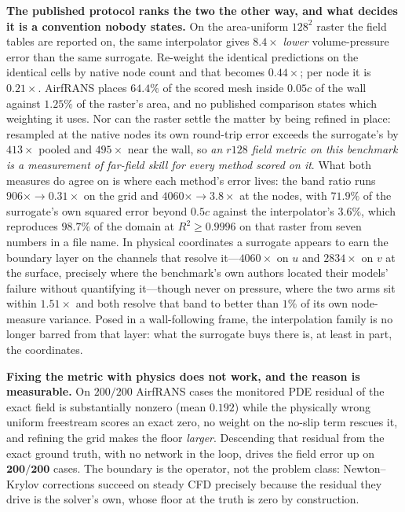 \textbf{The published protocol ranks the two the other way, and what decides it is a
convention nobody states.} On the area-uniform $128^2$ raster the field tables are reported on, the
same interpolator gives $8.4\times$ \emph{lower} volume-pressure error than the same
surrogate. Re-weight the identical predictions on the identical cells by native node count
and that becomes $0.44\times$; per node it is $0.21\times$. AirfRANS places $64.4\%$ of the
scored mesh inside $0.05c$ of the wall against $1.25\%$ of the raster's area, and no published
comparison states which weighting it uses. Nor can the raster settle the matter by being
refined in place: resampled at the native nodes its own round-trip error exceeds the
surrogate's by $413\times$ pooled and $495\times$ near the wall, so \emph{an $r128$ field
metric on this benchmark is a measurement of far-field skill for every method scored on
it}. What both measures do agree on is where each method's error lives: the band ratio runs
$906\times \to 0.31\times$ on the grid and $4060\times \to 3.8\times$ at the nodes, with
$71.9\%$ of the surrogate's own squared error beyond $0.5c$ against the interpolator's
$3.6\%$, which reproduces $98.7\%$ of the domain at $R^2\ge0.9996$ on that raster from seven
numbers in a file name. In physical coordinates a surrogate appears to earn the boundary
layer on the channels that resolve it---$4060\times$ on $u$ and $2834\times$ on $v$ at the
surface, precisely where the benchmark's own authors located their models' failure without
quantifying it---though never on pressure, where the two arms sit within $1.51\times$ and
both resolve that band to better than $1\%$ of its own node-measure variance. Posed in a
wall-following frame, the interpolation family is no longer barred from that layer: what the
surrogate buys there is, at least in part, the coordinates.

\textbf{Fixing the metric with physics does not work, and the reason is measurable.} On
$200/200$ AirfRANS cases the monitored PDE residual of the exact field is substantially
nonzero (mean $0.192$) while the physically wrong uniform freestream scores an exact zero,
no weight on the no-slip term rescues it, and
refining the grid makes the floor \emph{larger}. Descending that residual from the exact
ground truth, with no network in the loop, drives the field error up on
$\mathbf{200/200}$ cases. The boundary is the operator, not the problem class:
Newton--Krylov corrections succeed on steady CFD precisely because the residual they drive
is the solver's own, whose floor at the truth is zero by construction.

